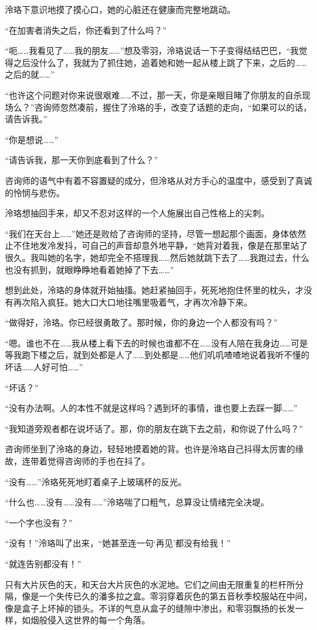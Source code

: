 \documentclass[UTF8, scheme = chinese, openany]{ctexbook}
\begin{document}
泠珞下意识地摸了摸心口，她的心脏还在健康而完整地跳动。

“在加害者消失之后，你还看到了什么吗？”

“呃……我看见了……我的朋友……”想及零羽，泠珞说话一下子变得结结巴巴，“我觉得之后没什么了，我就为了抓住她，追着她和她一起从楼上跳了下来，之后的……之后的就……”

“也许这个问题对你来说很艰难……不过，那一天，你是亲眼目睹了你朋友的自杀现场么？”咨询师忽然凑前，握住了泠珞的手，改变了话题的走向，“如果可以的话，请告诉我。”

“你是想说……”

“请告诉我，那一天你到底看到了什么？”

咨询师的语气中有着不容置疑的成分，但泠珞从对方手心的温度中，感受到了真诚的怜悯与悲伤。

泠珞想抽回手来，却又不忍对这样的一个人施展出自己性格上的尖刺。

“我们在天台上……”她还是败给了咨询师的坚持，尽管一想起那个画面，身体依然止不住地发冷发抖，可自己的声音却意外地平静，“她背对着我，像是在那里站了很久。我叫她的名字，她却完全不搭理我……然后她就跳下去了……我跑过去，什么也没有抓到，就眼睁睁地看着她掉了下去……”

想到此处，泠珞的身体就开始抽搐。她赶紧抽回手，死死地抱住怀里的枕头，才没有再次陷入疯狂。她大口大口地往嘴里吸着气，才再次冷静下来。

“做得好，泠珞。你已经很勇敢了。那时候，你的身边一个人都没有吗？”

“嗯。谁也不在……我从楼上看下去的时候也谁都不在……没有人陪在我身边……可是等我跑下楼之后，就到处都是人了……到处都是……他们叽叽喳喳地说着我听不懂的坏话……人好可怕……”

“坏话？”

“没有办法啊。人的本性不就是这样吗？遇到坏的事情，谁也要上去踩一脚……”

“我知道旁观者都在说坏话了。那，你的朋友在跳下去之前，和你说了什么吗？”

咨询师坐到了泠珞的身边，轻轻地摸着她的背。也许是泠珞自己抖得太厉害的缘故，连带着觉得咨询师的手也在抖了。

“没有……”泠珞死死地盯着桌子上玻璃杯的反光。

“什么也……没有……没有……”泠珞喘了口粗气，总算没让情绪完全决堤。

“一个字也没有？”

“没有！”泠珞叫了出来，“她甚至连一句‘再见’都没有给我！”

“就连告别都没有！”

只有大片灰色的天，和天台大片灰色的水泥地。它们之间由无限重复的栏杆所分隔，像是一个失传已久的潘多拉之盒。零羽穿着灰色的第五音秋季校服站在中间，像是盒子上坏掉的锁头。不详的气息从盒子的缝隙中渗出，和零羽飘扬的长发一样，如烟般侵入这世界的每一个角落。
\end{document}
